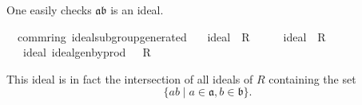 \documentclass[12pt]{scrartcl}
\begin{document}
One easily checks $\mathfrak{a} \mathfrak{b}$ is an ideal.


\begin{isabelle}
\isamarkupfalse%
\ {\isacharparenleft}{\kern0pt}\ comm{\isacharunderscore}{\kern0pt}ring{\isacharparenright}{\kern0pt}\ ideal{\isacharunderscore}{\kern0pt}subgroup{\isacharunderscore}{\kern0pt}generated{\isacharcolon}{\kern0pt}\isanewline
\ \ \ {\isachardoublequoteopen}ideal\ {\isasymaa}\ R\ {\isacharparenleft}{\kern0pt}{\isacharplus}{\kern0pt}{\isacharparenright}{\kern0pt}\ {\isacharparenleft}{\kern0pt}{\isasymcdot}{\isacharparenright}{\kern0pt}\ {\isasymzero}\ {\isasymone}{\isachardoublequoteclose}\ \ {\isachardoublequoteopen}ideal\ {\isasymbb}\ R\ {\isacharparenleft}{\kern0pt}{\isacharplus}{\kern0pt}{\isacharparenright}{\kern0pt}\ {\isacharparenleft}{\kern0pt}{\isasymcdot}{\isacharparenright}{\kern0pt}\ {\isasymzero}\ {\isasymone}{\isachardoublequoteclose}\isanewline
\ \ \ {\isachardoublequoteopen}ideal\ {\isacharparenleft}{\kern0pt}ideal{\isacharunderscore}{\kern0pt}gen{\isacharunderscore}{\kern0pt}by{\isacharunderscore}{\kern0pt}prod\ {\isasymaa}\ {\isasymbb}{\isacharparenright}{\kern0pt}\ R\ {\isacharparenleft}{\kern0pt}{\isacharplus}{\kern0pt}{\isacharparenright}{\kern0pt}\ {\isacharparenleft}{\kern0pt}{\isasymcdot}{\isacharparenright}{\kern0pt}\ {\isasymzero}\ {\isasymone}{\isachardoublequoteclose}
\end{isabelle}

This ideal is in fact the intersection of all ideals of $R$ containing the set
	\[
	\lbrace a b \mid a \in \mathfrak{a}, b \in \mathfrak{b} \rbrace .
	\]
	
\end{document}

